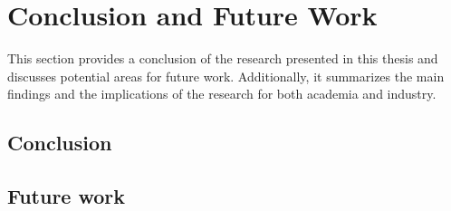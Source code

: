 \chapter{Conclusion and Future Work}
This section provides a conclusion of the research presented in this thesis and discusses potential areas for future work. Additionally, it summarizes the main findings and the implications of the research for both academia and industry.
\section{Conclusion}


\section{Future work}
